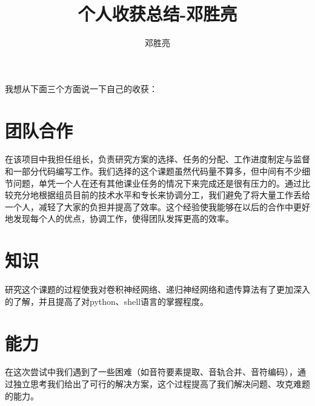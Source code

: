 \documentclass{article}
\author{邓胜亮}
\title{个人收获总结-邓胜亮}
\begin{document}
  \maketitle
  我想从下面三个方面说一下自己的收获：
  \section{团队合作}
  在该项目中我担任组长，负责研究方案的选择、任务的分配、工作进度制定与监督和一部分代码编写工作。我们选择的这个课题虽然代码量不算多，但中间有不少细节问题，单凭一个人在还有其他课业任务的情况下来完成还是很有压力的。通过比较充分地根据组员目前的技术水平和专长来协调分工，我们避免了将大量工作丢给一个人，减轻了大家的负担并提高了效率。这个经验使我能够在以后的合作中更好地发现每个人的优点，协调工作，使得团队发挥更高的效率。
   \section{知识}
   研究这个课题的过程使我对卷积神经网络、递归神经网络和遗传算法有了更加深入的了解，并且提高了对python、shell语言的掌握程度。
   \section{能力}
   在这次尝试中我们遇到了一些困难（如音符要素提取、音轨合并、音符编码），通过独立思考我们给出了可行的解决方案，这个过程提高了我们解决问题、攻克难题的能力。
\end{document}
